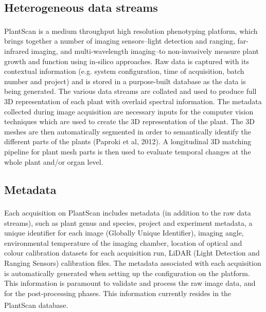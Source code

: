 \documentclass{llncs}
\begin{document}
\subsection{Heterogeneous data streams}

PlantScan\textsuperscript{\texttrademark} is a medium throughput high resolution
phenotyping platform, which brings together a number of imaging sensors--light 
detection and ranging, far-infrared imaging, and multi-wavelength imaging--to non-invasively measure plant growth and function using in-silico approaches.
Raw data is captured with
its contextual information (e.g. system configuration, time of acquisition,
batch number and project) and is stored in a purpose-built database as the data
is being generated. The various data streams are collated and used to produce
full 3D representation of each plant with overlaid spectral information. The
metadata collected during image acquisition are necessary inputs for the
computer vision techniques which are used to create the 3D representation of the
plant.
The 3D meshes are then automatically segmented in order to
semantically identify the different parts of the plants (Paproki et al, 2012). A
longitudinal 3D matching pipeline for plant mesh parts is then used to evaluate 
temporal changes at the whole plant and/or organ level. 


\subsection{Metadata}
Each acquisition on PlantScan\textsuperscript{\texttrademark} includes metadata
(in addition to the raw data
streams), such as plant genus and species, project and experiment metadata, a
unique identifier for each image (Globally Unique Identifier), imaging angle,
environmental temperature of the imaging chamber, location of optical and colour
calibration datasets for each acquisition run, LiDAR (Light Detection and
Ranging Sensors) calibration files. The metadata associated with each
acquisition is automatically generated when setting up the configuration on the
platform. This information is paramount to validate and process the raw image
data, and for the post-processing phases. This information currently resides in
the PlantScan\textsuperscript{\texttrademark} database.
\end{document}
